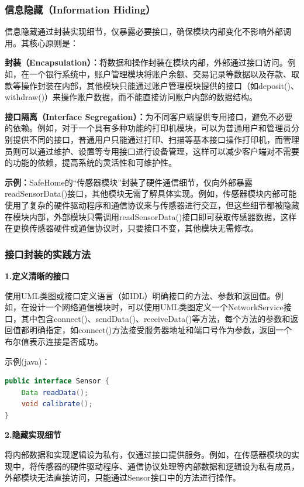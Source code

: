 \subsubsection{信息隐藏（Information Hiding）}

信息隐藏通过封装实现细节，仅暴露必要接口，确保模块内部变化不影响外部调用。其核心原则是：

\textbf{封装（Encapsulation）：}将数据和操作封装在模块内部，外部通过接口访问。例如，在一个银行系统中，账户管理模块将账户余额、交易记录等数据以及存款、取款等操作封装在内部，其他模块只能通过账户管理模块提供的接口（如deposit()、withdraw()）来操作账户数据，而不能直接访问账户内部的数据结构。

\textbf{接口隔离（Interface Segregation）：}为不同客户端提供专用接口，避免不必要的依赖。例如，对于一个具有多种功能的打印机模块，可以为普通用户和管理员分别提供不同的接口，普通用户只能通过打印、扫描等基本接口操作打印机，而管理员则可以通过维护、设置等专用接口进行设备管理，这样可以减少客户端对不需要的功能的依赖，提高系统的灵活性和可维护性。

\textbf{示例：}SafeHome的``传感器模块''封装了硬件通信细节，仅向外部暴露readSensorData()接口，其他模块无需了解具体实现。例如，传感器模块内部可能使用了复杂的硬件驱动程序和通信协议来与传感器进行交互，但这些细节都被隐藏在模块内部，外部模块只需调用readSensorData()接口即可获取传感器数据，这样在更换传感器硬件或通信协议时，只要接口不变，其他模块无需修改。

\subsubsection{接口封装的实践方法}

\textbf{1.定义清晰的接口}

使用UML类图或接口定义语言（如IDL）明确接口的方法、参数和返回值。例如，在设计一个网络通信模块时，可以使用UML类图定义一个NetworkService接口，其中包含connect()、sendData()、receiveData()等方法，每个方法的参数和返回值都明确指定，如connect()方法接受服务器地址和端口号作为参数，返回一个布尔值表示连接是否成功。

示例(java)：

\begin{lstlisting}[language=Java]
public interface Sensor {
    Data readData();
    void calibrate();
}
\end{lstlisting}

\textbf{2.隐藏实现细节}

将内部数据和实现逻辑设为私有，仅通过接口提供服务。例如，在传感器模块的实现中，将传感器的硬件驱动程序、通信协议处理等内部数据和逻辑设为私有成员，外部模块无法直接访问，只能通过Sensor接口中的方法进行操作。

